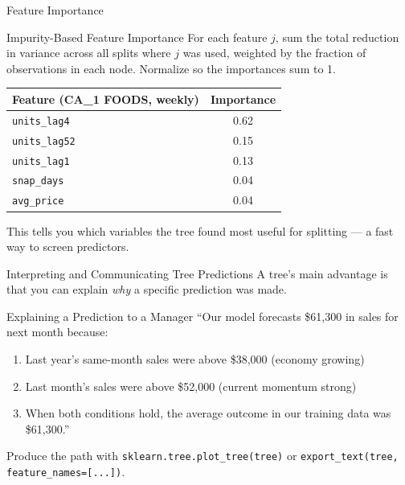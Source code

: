 \documentclass[aspectratio=169, 11pt]{beamer}
\begin{document}
\begin{frame}{Feature Importance \parencite{Molnar2022}}
  \begin{definitionbox}{Impurity-Based Feature Importance}
    For each feature $j$, sum the total reduction in variance across all splits
    where $j$ was used, weighted by the fraction of observations in each node.
    Normalize so the importances sum to 1.
  \end{definitionbox}
  \begin{center}
    {\small
    \begin{tabular}{lc}
      \toprule
      \textbf{Feature (CA\_1 FOODS, weekly)} & \textbf{Importance} \\
      \midrule
      \texttt{units\_lag4}  & 0.62 \\
      \texttt{units\_lag52} & 0.15 \\
      \texttt{units\_lag1}  & 0.13 \\
      \texttt{snap\_days}   & 0.04 \\
      \texttt{avg\_price}   & 0.04 \\
      \bottomrule
    \end{tabular}
    }
  \end{center}
  \vspace{-0.1cm}
  This tells you which variables the tree found most useful for splitting ---
  a fast way to screen predictors.
\end{frame}

\begin{frame}{Interpreting and Communicating Tree Predictions}
  A tree's main advantage is that you can explain \emph{why} a specific
  prediction was made.
  \begin{examplebox}{Explaining a Prediction to a Manager}
    ``Our model forecasts \$61,300 in sales for next month because:
    \begin{enumerate}\small
      \item Last year's same-month sales were above \$38,000 (economy growing)
      \item Last month's sales were above \$52,000 (current momentum strong)
      \item When both conditions hold, the average outcome in our training
            data was \$61,300.''
    \end{enumerate}
  \end{examplebox}
  Produce the path with \texttt{sklearn.tree.plot\_tree(tree)} or
  \texttt{export\_text(tree, feature\_names=[...])}.
\end{frame}
\end{document}

